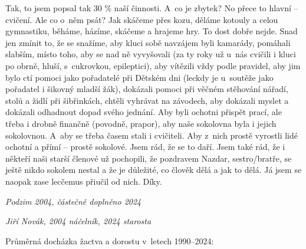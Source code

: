 \documentclass[a5paper, 11pt, twoside]{article}
\begin{document}
Tak, to jsem popsal tak 30 \% naší činnosti. A~co je zbytek? No přece to
hlavní -- cvičení. Ale co o~něm psát? Jak skáčeme přes kozu, děláme
kotouly a celou gymnastiku, běháme, házíme, skáčeme a hrajeme hry. To
dost dobře nejde. Snad jen zmínit to, že se snažíme, aby kluci sobě
navzájem byli kamarády, pomáhali slabším, místo toho, aby se nad ně
vyvyšovali (za ty roky už u~nás cvičili i kluci po obrně, hluší,
s~cukrovkou, epileptici), aby vítězili vždy podle pravidel, aby jim bylo
ctí pomoci jako pořadatelé při Dětském dni (leckdy je u~soutěže jako
pořadatel i šikovný mladší žák), dokázali pomoci při věčném stěhování
nářadí, stolů a židlí při šibřinkách, chtěli vyhrávat na závodech, aby
dokázali myslet a dokázali odhadnout dopad svého jednání. Aby byli
ochotni přispět prací, ale třeba i drobně finančně (povodně, prapor),
aby naše sokolovna byla i jejich sokolovnou. A~aby se třeba časem stali
i cvičiteli. Aby z~nich prostě vyrostli lidé ochotní a přímí -- prostě
sokolové. Jsem rád, že se to daří. Jsem také rád, že i někteří naši
starší členové už pochopili, že pozdravem Nazdar, sestro/bratře, se
ještě nikdo sokolem nestal a že je důležité, co člověk dělá a jak to
dělá. Já jsem se naopak zase lecčemus přiučil od nich. Díky.

\textit{Podzim 2004, částečně doplněno 2024}

\textit{Jiří Novák, 2004 náčelník, 2024 starosta}

Průměrná docházka žactva a dorostu v~letech 1990--2024:
\end{document}
